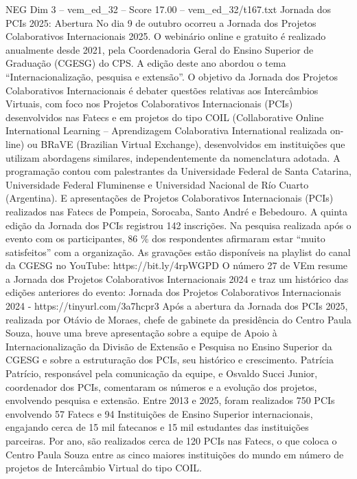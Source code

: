 \begin{textsample}{NEG Dim 3 – vem\_ed\_32 – Score 17.00 – vem\_ed\_32/t167.txt}  \label{ex:f3_neg_151}
Jornada dos PCIs 2025: Abertura No dia 9 de outubro ocorreu a Jornada dos Projetos Colaborativos Internacionais 2025.
O webinário online e gratuito é realizado anualmente desde 2021, pela Coordenadoria Geral do Ensino Superior de Graduação (CGESG) do CPS.
A edição deste ano abordou o tema “Internacionalização, pesquisa e extensão”.
O objetivo da Jornada dos Projetos Colaborativos Internacionais é debater questões relativas aos Intercâmbios Virtuais, com foco nos Projetos Colaborativos Internacionais (PCIs) desenvolvidos nas Fatecs e em projetos do tipo COIL (Collaborative Online International Learning – Aprendizagem Colaborativa International realizada on-line) ou BRaVE (Brazilian Virtual Exchange), desenvolvidos em instituições que utilizam abordagens similares, independentemente da nomenclatura adotada.
A programação contou com palestrantes da Universidade Federal de Santa Catarina, Universidade Federal Fluminense e Universidad Nacional de Río Cuarto (Argentina).
E apresentações de Projetos Colaborativos Internacionais (PCIs) realizados nas Fatecs de Pompeia, Sorocaba, Santo André e Bebedouro.
A quinta edição da Jornada dos PCIs registrou 142 inscrições.
Na pesquisa realizada após o evento com os participantes, 86 \% dos respondentes afirmaram estar “muito satisfeitos” com a organização.
As gravações estão disponíveis na playlist do canal da CGESG no YouTube: https://bit.ly/4rpWGPD O número 27 de VEm resume a Jornada dos Projetos Colaborativos Internacionais 2024 e traz um histórico das edições anteriores do evento: Jornada dos Projetos Colaborativos Internacionais 2024 - https://tinyurl.com/3a7hcpr3 Após a abertura da Jornada dos PCIs 2025, realizada por Otávio de Moraes, chefe de gabinete da presidência do Centro Paula Souza, houve uma breve apresentação sobre a equipe de Apoio à Internacionalização da Divisão de Extensão e Pesquisa no Ensino Superior da CGESG e sobre a estruturação dos PCIs, seu histórico e crescimento.
Patrícia Patrício, responsável pela comunicação da equipe, e Osvaldo Succi Junior, coordenador dos PCIs, comentaram os números e a evolução dos projetos, envolvendo pesquisa e extensão.
Entre 2013 e 2025, foram realizados 750 PCIs envolvendo 57 Fatecs e 94 Instituições de Ensino Superior internacionais, engajando cerca de 15 mil fatecanos e 15 mil estudantes das instituições parceiras.
Por ano, são realizados cerca de 120 PCIs nas Fatecs, o que coloca o Centro Paula Souza entre as cinco maiores instituições do mundo em número de projetos de Intercâmbio Virtual do tipo COIL.

\end{textsample}
